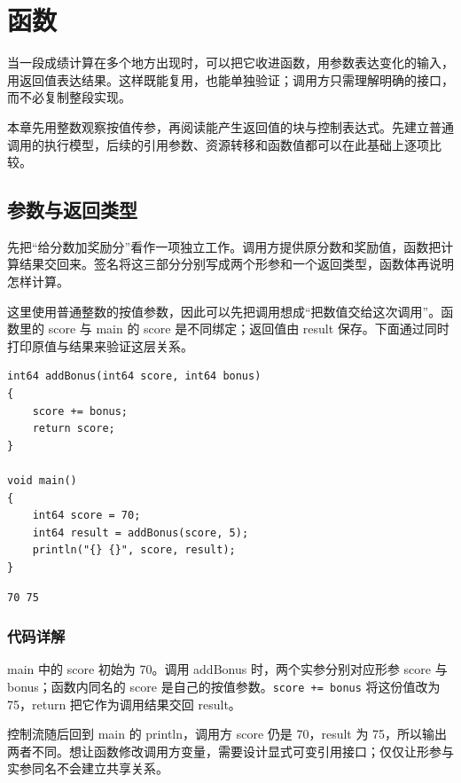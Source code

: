\chapter{函数}
\label{ch:04}

当一段成绩计算在多个地方出现时，可以把它收进函数，用参数表达变化的输入，用返回值表达结果。这样既能复用，也能单独验证；调用方只需理解明确的接口，而不必复制整段实现。

本章先用整数观察按值传参，再阅读能产生返回值的块与控制表达式。先建立普通调用的执行模型，后续的引用参数、资源转移和函数值都可以在此基础上逐项比较。

\section{参数与返回类型}

先把“给分数加奖励分”看作一项独立工作。调用方提供原分数和奖励值，函数把计算结果交回来。签名将这三部分分别写成两个形参和一个返回类型，函数体再说明怎样计算。

这里使用普通整数的按值参数，因此可以先把调用想成“把数值交给这次调用”。函数里的 score 与 main 的 score 是不同绑定；返回值由 result 保存。下面通过同时打印原值与结果来验证这层关系。

\par
\medskip
\begin{lstlisting}[style=chali]
int64 addBonus(int64 score, int64 bonus)
{
    score += bonus;
    return score;
}

void main()
{
    int64 score = 70;
    int64 result = addBonus(score, 5);
    println("{} {}", score, result);
}
\end{lstlisting}
\par
\medskip

\par
\medskip
\begin{lstlisting}[style=out]
70 75
\end{lstlisting}
\par
\medskip

\subsection*{代码详解}

main 中的 score 初始为 70。调用 addBonus 时，两个实参分别对应形参 score 与 bonus；函数内同名的 score 是自己的按值参数。\texttt{score +=\allowbreak{} bonus} 将这份值改为 75，return 把它作为调用结果交回 result。

控制流随后回到 main 的 println，调用方 score 仍是 70，result 为 75，所以输出两者不同。想让函数修改调用方变量，需要设计显式可变引用接口；仅仅让形参与实参同名不会建立共享关系。

